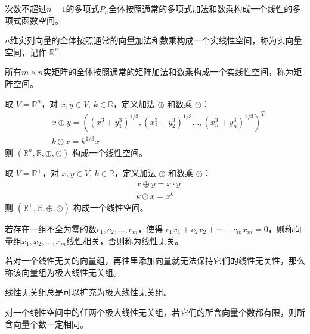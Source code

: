 \begin{example}
\label{ex:linearspace-pn}
次数不超过$n−1$的多项式$P_n$全体按照通常的多项式加法和数乘构成一个线性的多项式函数空间。
\end{example}
\begin{example}
$n$维实列向量的全体按照通常的向量加法和数乘构成一个实线性空间，称为实向量空间，记作 $\mathbb R^n$.
\end{example}
\begin{example}
所有$m\times n$实矩阵的全体按照通常的矩阵加法和数乘构成一个实线性空间，称为矩阵空间。
\end{example}
\begin{example}
\label{ex:linearspace}
取 $V=\mathbb R^n$，对 $x,y\in V,\,k\in\mathbb R$，定义加法 $\oplus$ 和数乘 $\odot$：
\begin{align*}
    &x\oplus y=\left((x_1^3+y_1^3)^{1/3},(x_2^3+y_2^3)^{1/3}\ldots,(x_n^3+y_n^3)^{1/3}\right)^T\\
    &k\odot x=k^{1/3}x
\end{align*}
则 $(\mathbb R^n,\mathbb R,\oplus,\odot)$ 构成一个线性空间。
\end{example}
\begin{example}
\label{ex:linearspace2}
取 $V=\mathbb R^+$，对 $x,y\in V,\,k\in\mathbb R$，定义加法 $\oplus$ 和数乘 $\odot$：
\begin{align*}
    &x\oplus y=x\cdot y\\
    &k\odot x=x^k
\end{align*}
则 $(\mathbb R^+,\mathbb R,\oplus,\odot)$ 构成一个线性空间。
\end{example}

\begin{definition}
若存在一组不全为零的数$c_1,c_2,\ldots,c_m$，使得 $c_1x_1+c_2x_2+\cdots+c_mx_m=0$，则称向量组$x_1,x_2,\ldots,x_m$线性相关，否则称为线性无关。
\end{definition}

\begin{definition}[极大线性无关组]
若对一个线性无关的向量组，再往里添加向量就无法保持它们的线性无关性，那么称该向量组为极大线性无关组。
\end{definition}

\begin{theorem}[有限维空间的基本假设]
线性无关组总是可以扩充为极大线性无关组。
\end{theorem}

\begin{lemma}
\label{lemma:maxlinear}
对一个线性空间中的任两个极大线性无关组，若它们的所含向量个数都有限，则所含向量个数一定相同。
\end{lemma}

